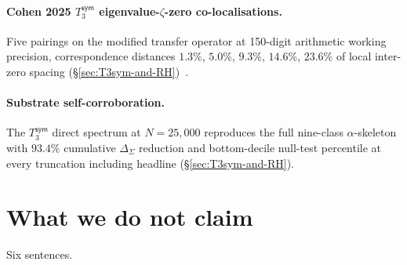 \documentclass[11pt,a4paper]{amsart}
\theoremstyle{plain}
\theoremstyle{definition}
\begin{document}
\paragraph{Cohen 2025 $T_3^{\textsf{sym}}$ eigenvalue-$\zeta$-zero co-localisations.} Five pairings on the modified transfer operator at 150-digit arithmetic working precision, correspondence distances $1.3\%$, $5.0\%$, $9.3\%$, $14.6\%$, $23.6\%$ of local inter-zero spacing (\S\ref{sec:T3sym-and-RH})~\cite{cohen2025transferOp}.

\paragraph{Substrate self-corroboration.} The $T_3^{\textsf{sym}}$ direct spectrum at $N=25{,}000$ reproduces the full nine-class $\alpha$-skeleton with $93.4\%$ cumulative $\Delta_\Sigma$ reduction and bottom-decile null-test percentile at every truncation including headline (\S\ref{sec:T3sym-and-RH}).

\section{What we do not claim}\label{sec:honest-scope}

Six sentences.
\end{document}
